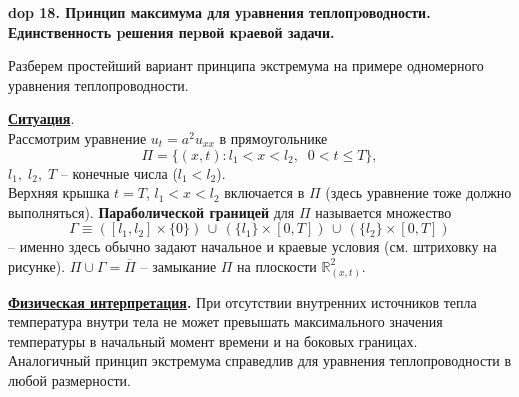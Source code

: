 \textbf{\LARGE dop 18. Пpинцип максимума для уpавнения теплопpоводности. Единственность pешения пеpвой кpаевой задачи.}
\renewcommand{\theequation}{\arabic{equation}} 
\setcounter{equation}{0}

Разберем простейший вариант принципа экстремума на примере одномерного уравнения теплопроводности. 

\noindent\underline{\textbf{Ситуация}}.\\[2mm] Рассмотрим уравнение $u_t = a^2 u_{xx}$ в  прямоугольнике $$\Pi = \{(x, t): l_1 < x < l_2,\;\; 0 < t \leq T \},$$ 
 \;\; $l_1,\; l_2,\; T$ -- конечные числа ($l_1 < l_2$).
\\ Верхняя крышка $t = T$, \;$l_1 < x < l_2$ включается в $\Pi$ (здесь уравнение тоже должно выполняться). \newline
\textbf{Параболической границей} для $\Pi$ называется множество $$\Gamma \equiv \left( [l_1, l_2] \times \{0\} \right)\, \cup\, \left( \{l_1\} \times [0, T] \right) \,\cup\, \left( \{l_2\} \times [0, T] \right)$$ -- именно здесь обычно задают начальное и краевые условия (см. штриховку на рисунке).\newline\newline
$\Pi \cup \Gamma = \overline{\Pi}$ -- замыкание $\Pi$ на плоскости $\mathbb{R}^2_{(x, t)}$.\newline


\noindent \textbf{\underline{Физическая интерпретация}.} При отсутствии внутренних источников тепла температура внутри тела не может превышать максимального значения температуры в начальный момент времени и на боковых границах. \\[2mm]
  Аналогичный принцип экстремума справедлив для уравнения теплопроводности в любой размерности.

